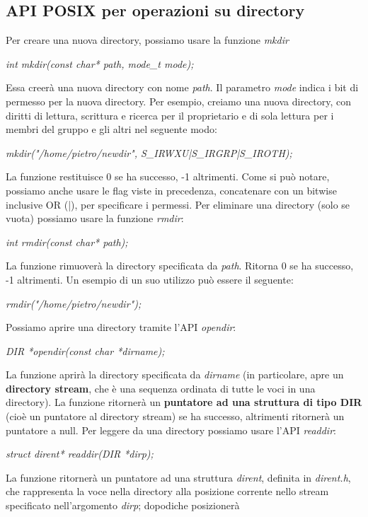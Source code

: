 \documentclass[12pt]{article}
\begin{document}
\subsection{API POSIX per operazioni su directory}
Per creare una nuova directory, possiamo usare la funzione \textit{mkdir}
\begin{center}
    \textit{int mkdir(const char* path, mode\_t mode);}
\end{center}
Essa creerà una nuova directory con nome \textit{path}. Il parametro \textit{mode} indica i bit di permesso per la nuova directory.
Per esempio, creiamo una nuova directory, con diritti di lettura, scrittura e ricerca per il proprietario e di sola lettura per i membri del gruppo e gli altri nel seguente modo:
\begin{center}
    \textit{mkdir("/home/pietro/newdir", S\_IRWXU|S\_IRGRP|S\_IROTH);}
\end{center}
La funzione restituisce 0 se ha successo, -1 altrimenti. Come si può notare, possiamo anche usare le flag viste in precedenza, concatenare con un bitwise inclusive OR (|), per specificare
i permessi. Per eliminare una directory (solo se vuota) possiamo usare la funzione \textit{rmdir}:
\begin{center}
    \textit{int rmdir(const char* path);}
\end{center}
La funzione rimuoverà la directory specificata da \textit{path}. Ritorna 0 se ha successo, -1 altrimenti. Un esempio di un suo utilizzo può essere il seguente:
\begin{center}
    \textit{rmdir("/home/pietro/newdir");}
\end{center}
Possiamo aprire una directory tramite l'API \textit{opendir}:
\begin{center}
    \textit{DIR *opendir(const char *dirname);}
\end{center}
La funzione aprirà la directory specificata da \textit{dirname} (in particolare, apre un \textbf{directory stream}, che è una sequenza ordinata di tutte le voci in una directory). La funzione ritornerà un \textbf{puntatore ad una struttura di tipo DIR} (cioè un puntatore al directory stream)
se ha successo, altrimenti ritornerà un puntatore a null. Per leggere da una directory possiamo usare l'API \textit{readdir}:
\begin{center}
    \textit{struct dirent* readdir(DIR *dirp);}
\end{center}
La funzione ritornerà un puntatore ad una struttura \textit{dirent}, definita in \textit{dirent.h}, che rappresenta la voce nella directory alla posizione corrente nello stream specificato nell'argomento \textit{dirp}; dopodiche posizionerà
\end{document}
